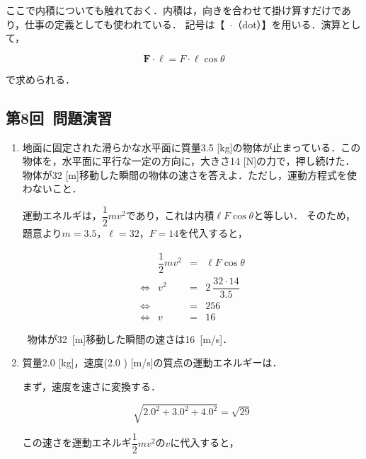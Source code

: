 \documentclass[a4paper,11pt]{ltjsarticle}
\begin{document}
ここで内積についても触れておく．内積は，向きを合わせて掛け算すだけであり，仕事の定義としても使われている．
記号は【\ $\cdot$（dot）】を用いる．演算として，

\begin{equation}
  \bm{F} \cdot \bm{\ell} = F \cdot \ell\cos\theta
\end{equation}

で求められる．

\subsection{第8回\ 問題演習}

\begin{enumerate}
  \item 地面に固定された滑らかな水平面に質量3.5 [kg]の物体が止まっている．この物体を，水平面に平行な一定の方向に，大きさ14 [N]の力で，押し続けた．物体が32 [m]移動した瞬間の物体の速さを答えよ．ただし，運動方程式を使わないこと．


  運動エネルギは，$\dfrac{1}{2}mv^2$であり，これは内積$\ell F\cos\theta$と等しい．
  そのため，題意より$m=3.5$，$\ell = 32$，$F = 14$を代入すると，

  \begin{equation}
  \renewcommand{\arraystretch}{2.5}
    \begin{array}{crcl}
      & \dfrac{1}{2}mv^2 &=& \ell F\cos\theta \\
      \Leftrightarrow & v^2 &=& 2\ \dfrac{32 \cdot 14}{3.5} \\
      \Leftrightarrow & &=& 256 \\
      \Leftrightarrow & v &=& 16
    \end{array}
  \end{equation}

  \therefore\ 物体が32\ [m]移動した瞬間の速さは16\ [m/s]．

  
  \item 質量2.0 [kg]，速度(2.0  ) [m/s]の質点の運動エネルギーは．


  まず，速度を速さに変換する．

  \begin{equation}
    \sqrt{2.0^2 + 3.0^2 + 4.0^2} = \sqrt{29}
  \end{equation}

  この速さを運動エネルギ$\dfrac{1}{2}mv^2$の$v$に代入すると，


\end{enumerate}
\end{document}
